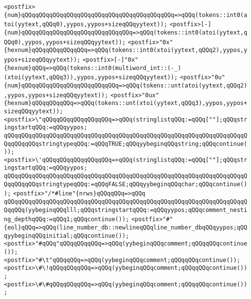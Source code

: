 \verb|<postfix>{num}qQQqqQQqqQQqqQQqqQQqqQQqqQQqqQQqqQQqqQQqqQQq=>qQQq(tokens::int0(atoi(yytext,qQQq0),yypos,yypos+sizeqQQqyytext));|\newline
\verb|<postfix>[-]{num}qQQqqQQqqQQqqQQqqQQqqQQqqQQqqQQq=>qQQq(tokens::int0(atoi(yytext,qQQq0),yypos,yypos+sizeqQQqyytext));|\newline
\verb|<postfix>"0x"{hexnum}qQQqqQQqqQQqqQQq=>qQQq(tokens::int0(xtoi(yytext,qQQq2),yypos,yypos+sizeqQQqyytext));|\newline
\verb|<postfix>[-]"0x"{hexnum}qQQq=>qQQq(tokens::int0(multiword_int::(-_)(xtoi(yytext,qQQq3)),yypos,yypos+sizeqQQqyytext));|\newline
\verb|<postfix>"0u"{num}qQQqqQQqqQQqqQQqqQQqqQQqqQQq=>qQQq(tokens::unt(atoi(yytext,qQQq2),yypos,yypos+sizeqQQqyytext));|\newline
\verb|<postfix>"0ux"{hexnum}qQQqqQQqqQQq=>qQQq(tokens::unt(xtoi(yytext,qQQq3),yypos,yypos+sizeqQQqyytext));|\newline
\verb|<postfix>\"qQQqqQQqqQQqqQQqqQQq=>qQQq(stringlistqQQq:=qQQq[""];qQQqstringstartqQQq:=qQQqyypos;|\newline
\verb|qQQqqQQqqQQqqQQqqQQqqQQqqQQqqQQqqQQqqQQqqQQqqQQqqQQqqQQqqQQqqQQqqQQqqQQqqQQqqQQqstringtypeqQQq:=qQQqTRUE;qQQqyybeginqQQqstring;qQQqcontinue());|\newline
\verb|<postfix>\'qQQqqQQqqQQqqQQqqQQq=>qQQq(stringlistqQQq:=qQQq[""];qQQqstringstartqQQq:=qQQqyypos;|\newline
\verb|qQQqqQQqqQQqqQQqqQQqqQQqqQQqqQQqqQQqqQQqqQQqqQQqqQQqqQQqqQQqqQQqqQQqqQQqqQQqqQQqstringtypeqQQq:=qQQqFALSE;qQQqyybeginqQQqchar;qQQqcontinue());|\newline
\verb|<postfix>"/*#line"{nrws}qQQqqQQq=>qQQq|\newline
\verb|qQQqqQQqqQQqqQQqqQQqqQQqqQQqqQQqqQQqqQQqqQQqqQQqqQQqqQQqqQQqqQQqqQQqqQQqqQQq(yybeginqQQqlll;qQQqstringstartqQQq:=qQQqyypos;qQQqcomment_nesting_depthqQQq:=qQQq1;qQQqcontinue());|\newline
\verb|<postfix>"#"{eol}qQQq=>qQQq(line_number_db::newlineqQQqline_number_dbqQQqyypos;qQQqyybeginqQQqinitial;qQQqcontinue());|\newline
\verb|<postfix>"#qQQq"qQQqqQQqqQQq=>qQQq(yybeginqQQqcomment;qQQqqQQqcontinue());|\newline
\verb|<postfix>"#\t"qQQqqQQq=>qQQq(yybeginqQQqcomment;qQQqqQQqcontinue());|\newline
\verb|<postfix>\#\!qQQqqQQqqQQq=>qQQq(yybeginqQQqcomment;qQQqqQQqcontinue());|\newline
\verb|<postfix>\#\#qQQqqQQqqQQq=>qQQq(yybeginqQQqcomment;qQQqqQQqcontinue());|\newline
